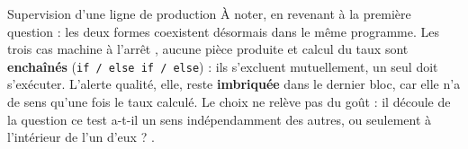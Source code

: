 \begin{UPSTIprofOnlyEnv}
\begin{UPSTIcorrectionP}{Supervision d'une ligne de production}
        À noter, en revenant à la première question : les deux formes coexistent désormais dans le même programme. Les trois cas \og machine à l'arrêt \fg, \og aucune pièce produite \fg{} et \og calcul du taux \fg{} sont \textbf{enchaînés} (\texttt{if / else if / else}) : ils s'excluent mutuellement, un seul doit s'exécuter. L'alerte qualité, elle, reste \textbf{imbriquée} dans le dernier bloc, car elle n'a de sens qu'une fois le taux calculé. Le choix ne relève pas du goût : il découle de la question \og ce test a-t-il un sens indépendamment des autres, ou seulement à l'intérieur de l'un d'eux ? \fg.
    \end{UPSTIcorrectionP}
\end{UPSTIprofOnlyEnv}
